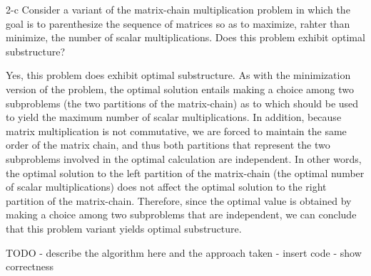 \documentclass[11pt]{article}
\begin{document}
\begin{prob}{2-c}
Consider a variant of the matrix-chain multiplication problem in which the goal is to parenthesize the sequence of matrices so as to maximize, rahter than minimize, the number of scalar multiplications. Does this problem exhibit optimal substructure?
\end{prob}
\begin{sol}
Yes, this problem does exhibit optimal substructure. As with the minimization version of the problem, the optimal solution entails making a choice among two subproblems (the two partitions of the matrix-chain) as to which should be used to yield the maximum number of scalar multiplications. In addition, because matrix multiplication is not commutative, we are forced to maintain the same order of the matrix chain, and thus both partitions that represent the two subproblems involved in the optimal calculation are independent. In other words, the optimal solution to the left partition of the matrix-chain (the optimal number of scalar multiplications) does not affect the optimal solution to the right partition of the matrix-chain. Therefore, since the optimal value is obtained by making a choice among two subproblems that are independent, we can conclude that this problem variant yields optimal substructure.
\end{sol}

\begin{prob}{3}
\end{prob}
\begin{sol}
TODO - describe the algorithm here and the approach taken - insert code - show correctness
\end{sol}
\end{document}
